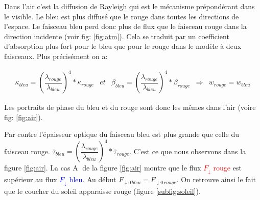 \documentclass[12pt]{article}
\begin{document}
Dans l'air c'est la diffusion de Rayleigh \cite{cours_Rayleigh} qui est le mécanisme prépondérant dans le visible. Le bleu est plus diffusé que le rouge dans toutes les directions de l'espace. Le faisceau bleu perd donc plus de flux que le faisceau rouge dans la direction incidente (voir fig: \ref{fig:atm}). Cela se traduit par un coefficient d'absorption plus fort pour le bleu que pour le rouge dans le modèle à deux faisceaux. Plus précisément on a:

\begingroup{}
\large
\begin{equation}
    \begin{matrix}
        \kappa_{bleu}=\left ( \dfrac{\lambda_{rouge}}{\lambda_{bleu}}\right )^4 *\kappa_{rouge} & et & \beta_{bleu}=\left ( \dfrac{\lambda_{rouge}}{\lambda_{bleu}}\right )^4 *\beta_{rouge} & \Rightarrow & w_{rouge}=w_{bleu}
    \end{matrix}
\end{equation}
\endgroup{}

Les portraits de phase du bleu et du rouge sont donc les mêmes dans l'air (voire fig: \ref{fig:air}).\par

Par contre l'épaisseur optique du faisceau bleu est plus grande que celle du faisceau rouge. $\bar{\tau}_{bleu}=\left ( \dfrac{\lambda_{rouge}}{\lambda_{bleu}}\right )^4 *\bar{\tau}_{rouge}$. C'est ce que nous observons dans la figure \ref{fig:air}. La cas \textcircled{\small A} de la figure \ref{fig:air} montre que le flux \textcolor{red}{$F_{\downarrow}$ rouge} est supérieur au flux \textcolor{blue}{$F_{\downarrow}$ bleu}. Au début $F_{\downarrow 0 \, bleu}=F_{\downarrow 0 \, rouge}$. On retrouve ainsi le fait que le coucher du soleil apparaisse rouge (figure \ref{subfig:soleil}).
\end{document}
